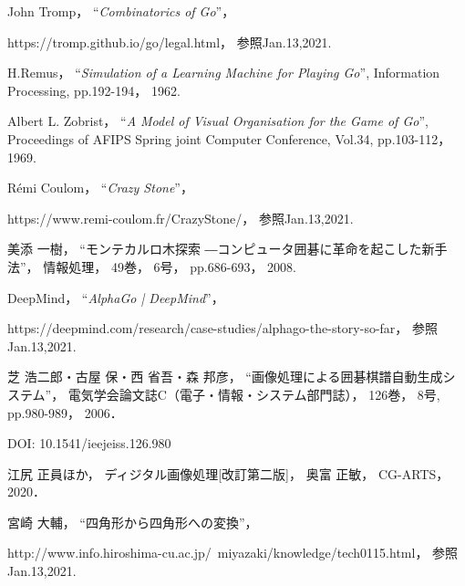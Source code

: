\documentclass[openright]{nitocs}
\numberwithin{equation}{section}
\begin{document}
    \begin{thebibliography}{10} %


        John Tromp，
        ``{\it Combinatorics of Go}''，

        https://tromp.github.io/go/legal.html，
        参照Jan.13,2021.

        H.Remus，
        ``{\it Simulation of a Learning Machine for Playing Go}'', 
        Information Processing, 
        pp.192-194，
        1962. 

        Albert L. Zobrist，
        ``{\it A Model of Visual Organisation for the Game of Go}'', 
        Proceedings of AFIPS Spring joint Computer Conference, 
        Vol.34, 
        pp.103-112，
        1969. 

        Rémi Coulom，
        ``{\it Crazy Stone}''，

        https://www.remi-coulom.fr/CrazyStone/，
        参照Jan.13,2021.

        美添 一樹，
        ``モンテカルロ木探索 ―コンピュータ囲碁に革命を起こした新手法''，
        情報処理，
        49巻，
        6号，
        pp.686-693，
        2008.

        DeepMind，
        ``{\it AlphaGo | DeepMind}''，

        https://deepmind.com/research/case-studies/alphago-the-story-so-far，
        参照Jan.13,2021.

        芝 浩二郎・古屋 保・西 省吾・森 邦彦，
        ``画像処理による囲碁棋譜自動生成システム''，
        電気学会論文誌C（電子・情報・システム部門誌），
        126巻，
        8号, 
        pp.980-989，
        2006．

        DOI: 10.1541/ieejeiss.126.980

        江尻 正員ほか，
        ディジタル画像処理[改訂第二版]，
        奥富 正敏，
        CG-ARTS，
        2020．

        宮崎 大輔，
        ``四角形から四角形への変換''，

        http://www.info.hiroshima-cu.ac.jp/~miyazaki/knowledge/tech0115.html，
        参照Jan.13,2021.

    \end{thebibliography}
\end{document}
